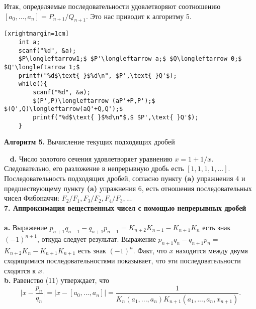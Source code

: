 \documentclass{mai_book}
\begin{document}
\noindent Итак, определяемые последовательности удовлетворяют соотношению\linebreak
$[a_0,...,a_n]=P_{n+1}/Q_{n+1}.$ \quad Это нас приводит к алгоритму 5.
\begin{center}
\begin{lstlisting}[mathescape=true][xrightmargin=1cm]
	int a;
	scanf("%d", &a);
	$P\longleftarrow1;$ $P'\longleftarrow a;$ $Q\longleftarrow 0;$ $Q'\longleftarrow 1;$
	printf("%d$\text{ }$%d\n", $P',\text{ }Q'$);
	while(){
		scanf("%d", &a);
		$(P',P)\longleftarrow (aP'+P,P');$ $(Q',Q)\longleftarrow(aQ'+Q,Q');$
		printf("%d$\text{ }$%d\n"$,$ $P',\text{ }Q'$);
	}
\end{lstlisting}
\textbf{Алгоритм 5.} Вычисление текущих подходящих дробей
\end{center}
\ \linebreak
\hspace*{15pt}\textbf{d.} Число золотого сечения удовлетворяет уравнению $x=1+1/x$.\linebreak
Следовательно, его разложение в непрерывную дробь есть $[1,1,1,1,...]$.
Последовательность подходящих дробей, согласно пункту \textbf{(a)} упражне­ния 4\linebreak
и предшествующему пункту \textbf{(a)} упражнения 6, есть отношения\linebreak
последовательных чисел Фибоначчи: $F_2/F_1,F_3/F_2,F_4/F_3,...$\newline
\\
\noindent\textbf{7. Аппроксимация вещественных чисел с помощью \newline \hspace*{13pt}непрерывных дробей}\\
\\
\hspace*{15pt}\textbf{a.} Выражение $p_{n+1}q_{n-1}-q_{n+1}p_{n-1}=K_{n+2}K_{n-1}-K_{n+1}K_n$ есть знак\linebreak 
$(-1)^{n+1}$, откуда следует результат. Выражение $p_{n+1}q_n-q_{n+1}p_n=$\linebreak
$K_{n+2}K_n-K_{n+1}K_{n+1}$ есть знак $(-1)^n$. Факт, что $x$ находится между двумя сходящимися последовательностями показывает, что эти последовательности сходятся к $x$.\newline
\\
\hspace*{15pt}\textbf{b.} Равенство (11) утверждает, что
$$\Bigg|x-\frac{p_n}{q_n}\Bigg| = \big|x-[a_0,...,a_n]\big|=\frac{1}{K_n(a_1,...,a_n)K_{n+1}(a_1,...,a_n,x_{n+1})}.$$\newpage
\end{document}
